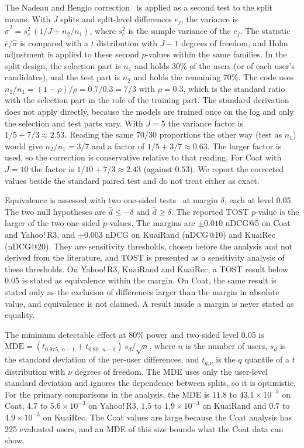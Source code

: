The Nadeau and Bengio correction~\citep{nadeau2003} is applied as a second test to the split means. With $J$ splits
and split-level differences $e_j$, the variance is $\hat\sigma^2 = s_e^2\,(1/J+n_2/n_1)$, where $s_e^2$ is the sample
variance of the $e_j$. The statistic $\bar e/\hat\sigma$ is compared with a $t$ distribution with $J-1$ degrees of
freedom, and Holm adjustment is applied to these second $p$-values within the same families. In the split design,
the selection part is $n_1$ and holds 30\% of the users (or of each user's candidates), and the test part is $n_2$
and holds the remaining 70\%. The code uses $n_2/n_1=(1-\rho)/\rho=0.7/0.3=7/3$ with $\rho=0.3$, which is the
standard ratio with the selection part in the role of the training part. The standard derivation does not apply
directly, because the models are trained once on the log and only the selection and test parts vary. With $J=5$ the
variance factor is $1/5+7/3\approx2.53$. Reading the same 70/30 proportions the other way (test as $n_1$) would give
$n_2/n_1=3/7$ and a factor of $1/5+3/7\approx0.63$. The larger factor is used, so the correction is conservative
relative to that reading. For Coat with $J=10$ the factor is $1/10+7/3\approx2.43$ (against $0.53$). We report the
corrected values beside the standard paired test and do not treat either as exact.

Equivalence is assessed with two one-sided tests~\citep{schuirmann1987} at margin $\delta$, each at level 0.05. The
two null hypotheses are $\bar d\le-\delta$ and $\bar d\ge\delta$. The reported TOST $p$-value is the larger of the two
one-sided $p$-values. The margins are $\pm0.010$ nDCG@5 on Coat and Yahoo!\,R3, and $\pm0.003$ nDCG on KuaiRand
(nDCG@10) and KuaiRec (nDCG@20). They are sensitivity thresholds, chosen before the analysis and not derived from
the literature, and TOST is presented as a sensitivity analysis of these thresholds. On Yahoo!\,R3, KuaiRand and
KuaiRec, a TOST result below 0.05 is stated as equivalence within the margin. On Coat, the same result is stated
only as the exclusion of differences larger than the margin in absolute value, and equivalence is not claimed. A
result inside a margin is never stated as equality.

The minimum detectable effect at 80\% power and two-sided level 0.05 is
$\mathrm{MDE}=(t_{0.975,\,n-1}+t_{0.80,\,n-1})\,s_d/\sqrt{n}$, where $n$ is the number of users, $s_d$ is the
standard deviation of the per-user differences, and $t_{q,\nu}$ is the $q$ quantile of a $t$ distribution with
$\nu$ degrees of freedom. The MDE uses only the user-level standard deviation and ignores the dependence between
splits, so it is optimistic. For the primary comparisons in the analysis, the MDE is $11.8$ to $43.1\times10^{-3}$
on Coat, $4.7$ to $5.6\times10^{-3}$ on Yahoo!\,R3, $1.5$ to $1.9\times10^{-3}$ on KuaiRand and $0.7$ to
$4.9\times10^{-3}$ on KuaiRec. The Coat values are large because the Coat analysis has 225 evaluated users,
and an MDE of this size bounds what the Coat data can show.


